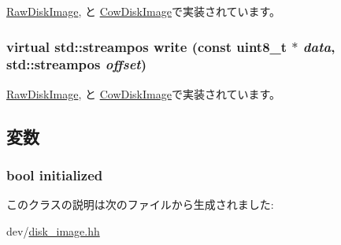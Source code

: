 \hyperlink{classRawDiskImage_ac47c8c9bb5ae5fbfa7e05b464d3e20d4}{RawDiskImage}, と \hyperlink{classCowDiskImage_ac47c8c9bb5ae5fbfa7e05b464d3e20d4}{CowDiskImage}で実装されています。\hypertarget{classDiskImage_a42c90a80133a988d65ab33cc4d31d168}{
\subsubsection[{write}]{\setlength{\rightskip}{0pt plus 5cm}virtual std::streampos write (const uint8\_\-t $\ast$ {\em data}, \/  std::streampos {\em offset})}}
\label{classDiskImage_a42c90a80133a988d65ab33cc4d31d168}


\hyperlink{classRawDiskImage_aadff68e91a6ca912a1878d79af3d0692}{RawDiskImage}, と \hyperlink{classCowDiskImage_aadff68e91a6ca912a1878d79af3d0692}{CowDiskImage}で実装されています。

\subsection{変数}
\hypertarget{classDiskImage_aedeffc7d23da25d52b9a50045189fe2b}{
\subsubsection[{initialized}]{\setlength{\rightskip}{0pt plus 5cm}bool {\bf initialized}}}
\label{classDiskImage_aedeffc7d23da25d52b9a50045189fe2b}


このクラスの説明は次のファイルから生成されました:\begin{DoxyCompactItemize}
\item 
dev/\hyperlink{disk__image_8hh}{disk\_\-image.hh}\end{DoxyCompactItemize}
